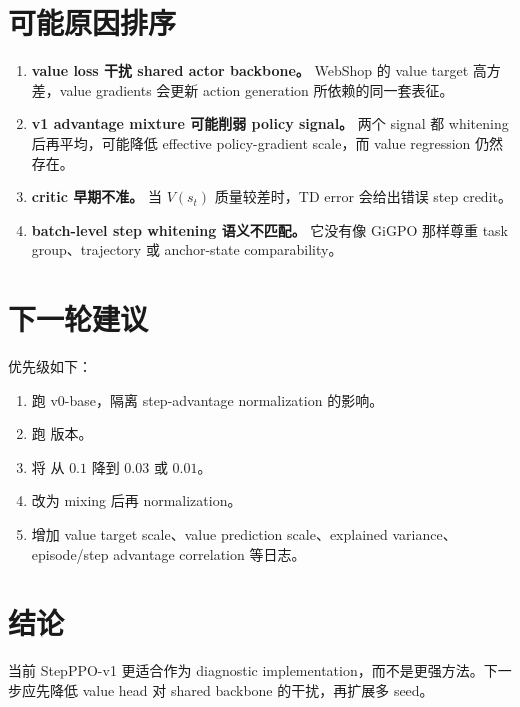 \documentclass[10pt]{ctexart}
\begin{document}
\section*{可能原因排序}
\begin{enumerate}
\item \textbf{value loss 干扰 shared actor backbone。} WebShop 的 value target 高方差，value gradients 会更新 action generation 所依赖的同一套表征。
\item \textbf{v1 advantage mixture 可能削弱 policy signal。} 两个 signal 都 whitening 后再平均，可能降低 effective policy-gradient scale，而 value regression 仍然存在。
\item \textbf{critic 早期不准。} 当 $V(s_t)$ 质量较差时，TD error 会给出错误 step credit。
\item \textbf{batch-level step whitening 语义不匹配。} 它没有像 GiGPO 那样尊重 task group、trajectory 或 anchor-state comparability。
\end{enumerate}

\section*{下一轮建议}
优先级如下：
\begin{enumerate}
\item 跑 v0-base，隔离 step-advantage normalization 的影响。
\item 跑  版本。
\item 将  从 $0.1$ 降到 $0.03$ 或 $0.01$。
\item 改为 mixing 后再 normalization。
\item 增加 value target scale、value prediction scale、explained variance、episode/step advantage correlation 等日志。
\end{enumerate}

\section*{结论}
当前 StepPPO-v1 更适合作为 diagnostic implementation，而不是更强方法。下一步应先降低 value head 对 shared backbone 的干扰，再扩展多 seed。
\end{document}
